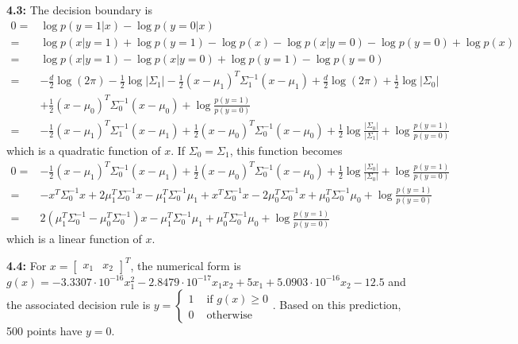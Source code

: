 \documentclass[12pt]{article}
\begin{document}
\textbf{4.3:} The decision boundary is\begin{align*}
    0=&\log p(y=1|x)-\log p(y=0|x)\\
    =&\log p(x|y=1)+\log p(y=1)-\log p(x)-\log p(x|y=0)-\log p(y=0)+\log p(x)\\
    =&\log p(x|y=1)-\log p(x|y=0)+\log p(y=1)-\log p(y=0)\\
    =&-\frac{d}{2}\log(2\pi)-\frac{1}{2}\log|\Sigma_1|-\frac{1}{2}(x-\mu_1)^T\Sigma_1^{-1}(x-\mu_1)+\frac{d}{2}\log(2\pi)+\frac{1}{2}\log|\Sigma_0|\\
    &+\frac{1}{2}(x-\mu_0)^T\Sigma_0^{-1}(x-\mu_0)+\log\frac{p(y=1)}{p(y=0)}\\
    =&-\frac{1}{2}(x-\mu_1)^T\Sigma_1^{-1}(x-\mu_1)+\frac{1}{2}(x-\mu_0)^T\Sigma_0^{-1}(x-\mu_0)+\frac{1}{2}\log\frac{|\Sigma_0|}{|\Sigma_1|}+\log\frac{p(y=1)}{p(y=0)}
\end{align*}which is a quadratic function of $x$. If $\Sigma_0=\Sigma_1$, this function becomes\begin{align*}
    0=&-\frac{1}{2}(x-\mu_1)^T\Sigma_0^{-1}(x-\mu_1)+\frac{1}{2}(x-\mu_0)^T\Sigma_0^{-1}(x-\mu_0)+\frac{1}{2}\log\frac{|\Sigma_0|}{|\Sigma_0|}+\log\frac{p(y=1)}{p(y=0)}\\
    =&-x^T\Sigma_0^{-1}x+2\mu_1^T\Sigma_0^{-1}x-\mu_1^T\Sigma_0^{-1}\mu_1+x^T\Sigma_0^{-1}x-2\mu_0^T\Sigma_0^{-1}x+\mu_0^T\Sigma_0^{-1}\mu_0+\log\frac{p(y=1)}{p(y=0)}\\
    =&2(\mu_1^T\Sigma_0^{-1}-\mu_0^T\Sigma_0^{-1})x-\mu_1^T\Sigma_0^{-1}\mu_1+\mu_0^T\Sigma_0^{-1}\mu_0+\log\frac{p(y=1)}{p(y=0)}
\end{align*}which is a linear function of $x$.

\textbf{4.4:} For $x=\begin{bmatrix} x_1 & x_2 \end{bmatrix}^T$, the numerical form is $g(x)=-3.3307\cdot 10^{-16}x_1^2-2.8479\cdot 10^{-17}x_1x_2+5x_1+5.0903\cdot 10^{-16}x_2-12.5$ and the associated decision rule is $y=\begin{cases}1&\text{ if }g(x)\geq 0 \\ 0&\text{ otherwise}\end{cases}$. Based on this prediction, 500 points have $y=0$.
\end{document}
